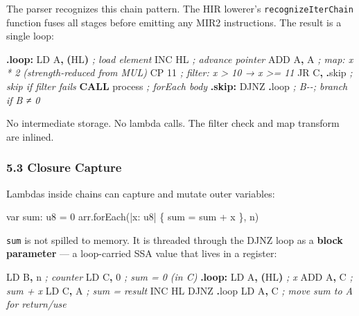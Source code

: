 \documentclass[
  11pt,
  a4paper,
]{report}
\newenvironment{Shaded}{\begin{snugshade}\small}{\end{snugshade}}
\newcommand{\BuiltInTok}[1]{#1}
\newcommand{\CommentTok}[1]{\textcolor[rgb]{0.56,0.35,0.01}{\textit{#1}}}
\newcommand{\ControlFlowTok}[1]{\textcolor[rgb]{0.13,0.29,0.53}{\textbf{#1}}}
\newcommand{\DecValTok}[1]{\textcolor[rgb]{0.00,0.00,0.81}{#1}}
\newcommand{\FunctionTok}[1]{\textcolor[rgb]{0.13,0.29,0.53}{\textbf{#1}}}
\newcommand{\NormalTok}[1]{#1}
\newcommand{\OperatorTok}[1]{\textcolor[rgb]{0.81,0.36,0.00}{\textbf{#1}}}
\begin{document}
The parser recognizes this chain pattern. The HIR lowerer's
\texttt{recognizeIterChain} function fuses all stages before emitting
any MIR2 instructions. The result is a single loop:

\begin{Shaded}
\begin{Highlighting}[]
\FunctionTok{.loop:}
\NormalTok{    LD A}\OperatorTok{,} \OperatorTok{(}\NormalTok{HL}\OperatorTok{)}       \CommentTok{; load element}
    \BuiltInTok{INC}\NormalTok{ HL           }\CommentTok{; advance pointer}
    \BuiltInTok{ADD}\NormalTok{ A}\OperatorTok{,}\NormalTok{ A         }\CommentTok{; map: x * 2  (strength{-}reduced from MUL)}
\NormalTok{    CP }\DecValTok{11}            \CommentTok{; filter: x \textgreater{} 10 → x \textgreater{}= 11}
\NormalTok{    JR C}\OperatorTok{,} \OperatorTok{.}\NormalTok{skip      }\CommentTok{; skip if filter fails}
    \ControlFlowTok{CALL}\NormalTok{ process     }\CommentTok{; forEach body}
\FunctionTok{.skip:}
\NormalTok{    DJNZ }\OperatorTok{.}\NormalTok{loop       }\CommentTok{; B{-}{-}; branch if B ≠ 0}
\end{Highlighting}
\end{Shaded}

No intermediate storage. No lambda calls. The filter check and map
transform are inlined.

\subsubsection{5.3 Closure Capture}\label{closure-capture}

Lambdas inside chains can capture and mutate outer variables:

\begin{Shaded}
\begin{Highlighting}[]
\NormalTok{var sum: u8 = 0}
\NormalTok{arr.forEach(|x: u8| \{ sum = sum + x \}, n)}
\end{Highlighting}
\end{Shaded}

\texttt{sum} is not spilled to memory. It is threaded through the DJNZ
loop as a \textbf{block parameter} --- a loop-carried SSA value that
lives in a register:

\begin{Shaded}
\begin{Highlighting}[]
\NormalTok{    LD B}\OperatorTok{,}\NormalTok{ n          }\CommentTok{; counter}
\NormalTok{    LD C}\OperatorTok{,} \DecValTok{0}          \CommentTok{; sum = 0 (in C)}
\FunctionTok{.loop:}
\NormalTok{    LD A}\OperatorTok{,} \OperatorTok{(}\NormalTok{HL}\OperatorTok{)}       \CommentTok{; x}
    \BuiltInTok{ADD}\NormalTok{ A}\OperatorTok{,}\NormalTok{ C         }\CommentTok{; sum + x}
\NormalTok{    LD C}\OperatorTok{,}\NormalTok{ A          }\CommentTok{; sum = result}
    \BuiltInTok{INC}\NormalTok{ HL}
\NormalTok{    DJNZ }\OperatorTok{.}\NormalTok{loop}
\NormalTok{    LD A}\OperatorTok{,}\NormalTok{ C          }\CommentTok{; move sum to A for return/use}
\end{Highlighting}
\end{Shaded}
\end{document}
